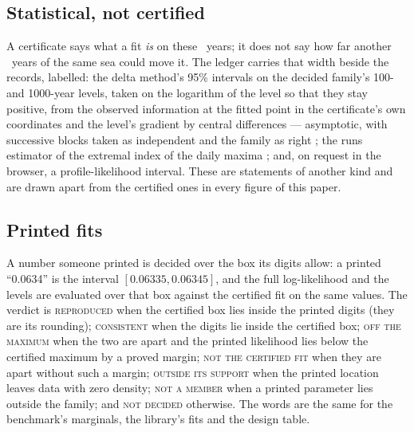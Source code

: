 \documentclass[preprint,11pt,authoryear]{elsarticle}
\begin{document}
\subsection{Statistical, not certified}\label{sec:stat}
A certificate says what a fit \emph{is} on these \AYears\ years; it does not say how far another \AYears\ years of the same sea could move it. The ledger carries that width beside the records, labelled: the delta method's 95\% intervals on the decided family's 100- and 1000-year levels, taken on the logarithm of the level so that they stay positive, from the observed information at the fitted point in the certificate's own coordinates and the level's gradient by central differences --- asymptotic, with successive blocks taken as independent and the family as right \citep{coles2001}; the runs estimator of the extremal index of the daily maxima \citep{smith1994}; and, on request in the browser, a profile-likelihood interval. These are statements of another kind and are drawn apart from the certified ones in every figure of this paper.

\subsection{Printed fits}\label{sec:printedmethod}
A number someone printed is decided over the box its digits allow: a printed ``0.0634'' is the interval $[0.06335, 0.06345]$, and the full log-likelihood and the levels are evaluated over that box against the certified fit on the same values. The verdict is \textsc{reproduced} when the certified box lies inside the printed digits (they are its rounding); \textsc{consistent} when the digits lie inside the certified box; \textsc{off the maximum} when the two are apart and the printed likelihood lies below the certified maximum by a proved margin; \textsc{not the certified fit} when they are apart without such a margin; \textsc{outside its support} when the printed location leaves data with zero density; \textsc{not a member} when a printed parameter lies outside the family; and \textsc{not decided} otherwise. The words are the same for the benchmark's marginals, the library's fits and the design table.
\end{document}
